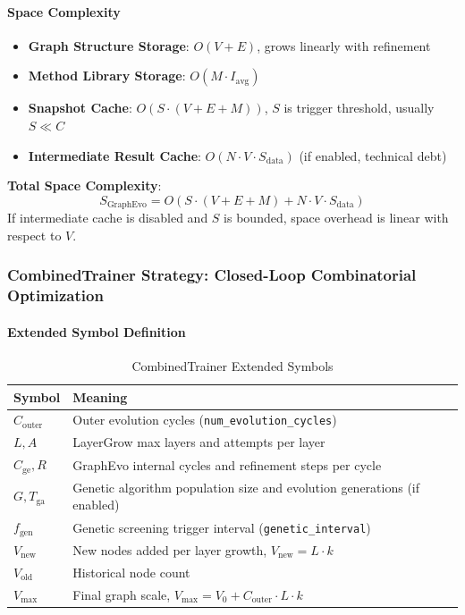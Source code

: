 \paragraph{Space Complexity}
\begin{itemize}
    \item \textbf{Graph Structure Storage}: $O(V + E)$, grows linearly with refinement
    \item \textbf{Method Library Storage}: $O(M \cdot I_{\mathrm{avg}})$
    \item \textbf{Snapshot Cache}: $O(S \cdot (V + E + M))$, $S$ is trigger threshold, usually $S \ll C$
    \item \textbf{Intermediate Result Cache}: $O(N \cdot V \cdot S_{\mathrm{data}})$ (if enabled, technical debt)
\end{itemize}

\textbf{Total Space Complexity}:
\begin{equation}
    S_{\mathrm{GraphEvo}} = O(S \cdot (V + E + M) + N \cdot V \cdot S_{\mathrm{data}})
\end{equation}
If intermediate cache is disabled and $S$ is bounded, space overhead is linear with respect to $V$.

\subsubsection{CombinedTrainer Strategy: Closed-Loop Combinatorial Optimization}

\paragraph{Extended Symbol Definition}
\begin{table}[htbp]
    \centering
    \caption{CombinedTrainer Extended Symbols}
    \label{tab:symbols_ct}
    \begin{tabular}{ll}
        \toprule
        \textbf{Symbol} & \textbf{Meaning} \\
        \midrule
        $C_{\mathrm{outer}}$ & Outer evolution cycles (\texttt{num\_evolution\_cycles}) \\
        $L, A$ & LayerGrow max layers and attempts per layer \\
        $C_{\mathrm{ge}}, R$ & GraphEvo internal cycles and refinement steps per cycle \\
        $G, T_{\mathrm{ga}}$ & Genetic algorithm population size and evolution generations (if enabled) \\
        $f_{\mathrm{gen}}$ & Genetic screening trigger interval (\texttt{genetic\_interval}) \\
        $V_{\mathrm{new}}$ & New nodes added per layer growth, $V_{\mathrm{new}} = L \cdot k$ \\
        $V_{\mathrm{old}}$ & Historical node count \\
        $V_{\max}$ & Final graph scale, $V_{\max} = V_0 + C_{\mathrm{outer}} \cdot L \cdot k$ \\
        \bottomrule
    \end{tabular}
\end{table}


